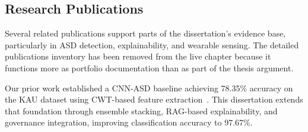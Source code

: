 \label{tab:thesis_structure}
\label{fig:diss_structure}

%

\label{tab:ch1_examiner_qa}

\subsection{Research Publications}
\label{sec:ch1_publications}

Several related publications support parts of the dissertation's evidence base, particularly in ASD detection, explainability, and wearable sensing. The detailed publications inventory has been removed from the live chapter because it functions more as portfolio documentation than as part of the thesis argument.

Our prior work established a CNN-ASD baseline achieving 78.35\% accuracy on the KAU dataset using CWT-based feature extraction~\cite{asthana2025cnnasd_icsit}. This dissertation extends that foundation through ensemble stacking, RAG-based explainability, and governance integration, improving classification accuracy to 97.67\%.

\label{tab:ch1_publications}

